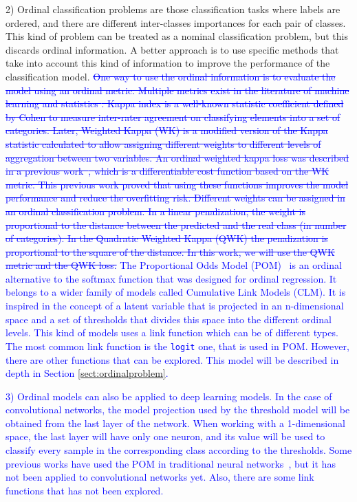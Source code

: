 \documentclass[journal]{IEEEtran}
\begin{document}
	2) Ordinal classification problems are those classification tasks where labels are ordered, and there are different inter-classes importances for each pair of classes. This kind of problem can be treated as a nominal classification problem, but this discards ordinal information. A better approach is to use specific methods that take into account this kind of information to improve the performance of the classification model. \textcolor{blue}{\sout{One way to use the ordinal information is to evaluate the model using an ordinal metric. Multiple metrics exist in the literature of machine learning and statistics \cite{cruz2014metrics,mehdiyev2016evaluating}. Kappa index is a well-known statistic coefficient defined by Cohen \cite{cohen1960coefficient} to measure inter-rater agreement on classifying elements into a set of categories. Later, Weighted Kappa (WK) is a modified version of the Kappa statistic calculated to allow assigning different weights to different levels of aggregation between two variables. An ordinal weighted kappa loss was described in a previous work~\cite{de2018weighted}, which is a differentiable cost function based on the WK metric. This previous work proved that using these functions improves the model performance and reduce the overfitting risk. Different weights can be assigned in an ordinal classification problem. In a linear penalization, the weight is proportional to the distance between the predicted and the real class (in number of categories). In the Quadratic Weighted Kappa (QWK) the penalization is proportional to the square of the distance. In this work, we will use the QWK metric and the QWK loss.} The Proportional Odds Model (POM)~\cite{agresti2010analysis} is an ordinal alternative to the softmax function that was designed for ordinal regression. It belongs to a wider family of models called Cumulative Link Models (CLM). It is inspired in the concept of a latent variable that is projected in an n-dimensional space and a set of thresholds that divides this space into the different ordinal levels. This kind of models uses a link function which can be of different types. The most common link function is the \texttt{logit} one, that is used in POM. However, there are other functions that can be explored. This model will be described in depth in Section \ref{sect:ordinalproblem}.}
	
	\textcolor{blue}{3) Ordinal models can also be applied to deep learning models. In the case of convolutional networks, the model projection used by the threshold model will be obtained from the last layer of the network. When working with a 1-dimensional space, the last layer will have only one neuron, and its value will be used to classify every sample in the corresponding class according to the thresholds. Some previous works have used the POM in traditional neural networks~\cite{gutierrez2016ordinal}, but it has not been applied to convolutional networks yet. Also, there are some link functions that has not been explored.}
	
\end{document}
